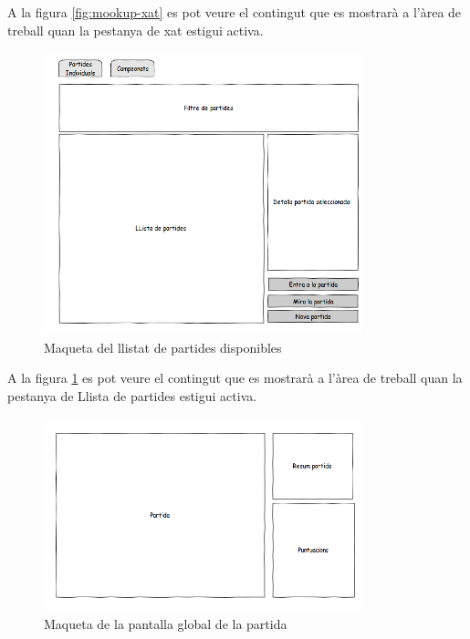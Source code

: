 A la figura \ref{fig:mookup-xat} es pot veure el contingut que es mostrarà a l'àrea de treball quan la pestanya de xat estigui activa. 

\begin{figure}[htbp]
\centering\includegraphics{img/Llista_Partides.png}
\caption{Maqueta del llistat de partides disponibles}
\label{fig:mookup-partides}
\end{figure} 

A la figura \ref{fig:mookup-partides} es pot veure el contingut que es mostrarà a l'àrea de treball quan la pestanya de Llista de partides estigui activa. 

\begin{figure}[htbp]
\centering\includegraphics{img/Global_Partida.png}
\caption{Maqueta de la pantalla global de la partida}
\label{fig:mookup-partida}
\end{figure} 

